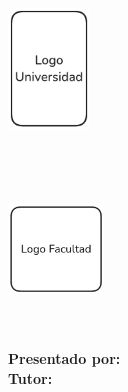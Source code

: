 \begin{titlepage}
    \begin{minipage}{2.16cm}
        \begin{center}
            \includegraphics[width=2.16cm,height=3.2cm]{img/caratula/logo_universidad.png}
        \end{center}
    \end{minipage}
    \hfill
    \begin{minipage}{10cm}
        \begin{center}
            \large{ \textbf{\MakeUppercase{\nombreUniversidad}} }\\
            \normalsize{ \textbf{\MakeUppercase{\nombreFacultad}} }\\
            \small{ \textbf{\MakeUppercase{\nombreCarrera}} }
        \end{center}
    \end{minipage}
    \hfill
    \begin{minipage}{2.55cm}
        \begin{center}
            \includegraphics[width=2.55cm,height=2.55cm]{img/caratula/logo_facultad.png}
        \end{center}
    \end{minipage}
    \vspace{5cm}\\

    \begin{center}
        \textbf{\Large\MakeUppercase{\nombreProyecto}}
    \end{center}

    \vspace{4cm}
    \begin{center}
        \Large\descripcion
    \end{center}

    \vspace{2cm}
    \Large\textnormal{\textbf{Presentado por:} \nombreAutor}\\
    \Large\textnormal{\textbf{Tutor:} \nombreTutor}\\

    \vspace{2cm}
    \begin{center}
        \large\textbf{\MakeUppercase{\nombreCiudadPais}}\\
        \fecha
    \end{center}
\end{titlepage}
\restoregeometry